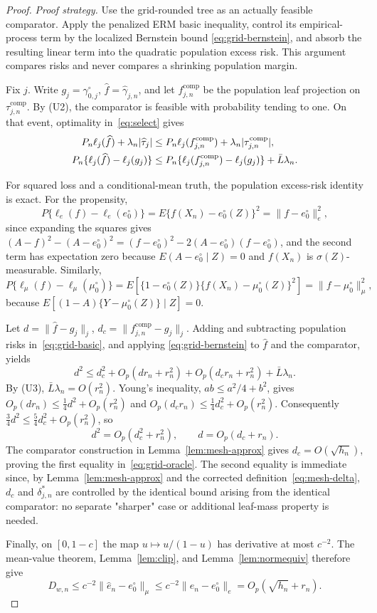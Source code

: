 \documentclass[11pt]{article}
\theoremstyle{plain}
\theoremstyle{definition}
\theoremstyle{remark}
\newcommand{\ez}{e_0}
\newcommand{\mz}{\mu_0}
\DeclarePairedDelimiter{\card}{\lvert}{\rvert}
\begin{document}
\begin{proof}
\emph{Proof strategy.} Use the grid-rounded tree as an actually feasible
comparator. Apply the penalized ERM basic inequality, control its
empirical-process term by the localized Bernstein bound
\eqref{eq:grid-bernstein}, and absorb the resulting linear term into the
quadratic population excess risk. This argument compares risks and never
compares a shrinking population margin.

Fix $j$. Write $g_j=\gamma_{0,j}^\circ$, $\widehat f=\widehat\gamma_{j,n}$,
and let $f^{\mathrm{comp}}_{j,n}$ be the population leaf projection on
$\tau^{\mathrm{comp}}_{j,n}$. By (U2), the comparator is feasible with
probability tending to one. On that event, optimality in~\eqref{eq:select}
gives
\begin{align}
 P_n\ell_j(\widehat f)+\lambda_n\card{\widehat\tau_j}
 &\le
 P_n\ell_j(f^{\mathrm{comp}}_{j,n})
   +\lambda_n\card{\tau^{\mathrm{comp}}_{j,n}},\\
 P_n\{\ell_j(\widehat f)-\ell_j(g_j)\}
 &\le
 P_n\{\ell_j(f^{\mathrm{comp}}_{j,n})-\ell_j(g_j)\}
   +\bar L\lambda_n.
 \label{eq:grid-basic}
\end{align}

For squared loss and a conditional-mean truth, the population excess-risk
identity is exact. For the propensity,
\[
 P\{\ell_e(f)-\ell_e(\ez^\circ)\}
 =E\{f(X_n)-\ez^\circ(Z)\}^2=\|f-\ez^\circ\|_e^2,
\]
since expanding the squares gives
$(A-f)^2-(A-\ez^\circ)^2=(f-\ez^\circ)^2-2(A-\ez^\circ)(f-\ez^\circ)$, and
the second term has expectation zero because $E(A-\ez^\circ\mid Z)=0$ and
$f(X_n)$ is $\sigma(Z)$-measurable. Similarly,
\[
 P\{\ell_\mu(f)-\ell_\mu(\mz^\circ)\}
 =E[\{1-\ez^\circ(Z)\}\{f(X_n)-\mz^\circ(Z)\}^2]
 =\|f-\mz^\circ\|_\mu^2,
\]
because $E[(1-A)\{Y-\mz^\circ(Z)\}\mid Z]=0$.

Let $d=\|\widehat f-g_j\|_j$, $d_c=\|f^{\mathrm{comp}}_{j,n}-g_j\|_j$.
Adding and subtracting population risks in~\eqref{eq:grid-basic}, and
applying \eqref{eq:grid-bernstein} to $\widehat f$ and the comparator,
yields
\[
 d^2
 \le d_c^2+O_p(dr_n+r_n^2)+O_p(d_cr_n+r_n^2)
       +\bar L\lambda_n.
\]
By (U3), $\bar L\lambda_n=O(r_n^2)$. Young's inequality,
$ab\le a^2/4+b^2$, gives $O_p(dr_n)\le\frac14d^2+O_p(r_n^2)$ and
$O_p(d_cr_n)\le\frac14d_c^2+O_p(r_n^2)$. Consequently
$\frac34d^2\le\frac54d_c^2+O_p(r_n^2)$, so
\[
 d^2=O_p(d_c^2+r_n^2),
 \qquad
 d=O_p(d_c+r_n).
\]
The comparator construction in Lemma~\ref{lem:mesh-approx} gives
$d_c=O(\sqrt{h_n})$, proving the first equality in~\eqref{eq:grid-oracle}.
The second equality is immediate since, by Lemma~\ref{lem:mesh-approx} and
the corrected definition~\eqref{eq:mesh-delta}, $d_c$ and $\delta^*_{j,n}$
are controlled by the identical bound arising from the identical
comparator: no separate "sharper" case or additional leaf-mass property is
needed.

Finally, on $[0,1-c]$ the map $u\mapsto u/(1-u)$ has derivative at most
$c^{-2}$. The mean-value theorem, Lemma~\ref{lem:clip}, and
Lemma~\ref{lem:normequiv} therefore give
\[
 D_{w,n}
 \le c^{-2}\|\widehat e_n-\ez^\circ\|_\mu
 \le c^{-2}\|\widehat e_n-\ez^\circ\|_e
 =O_p(\sqrt{h_n}+r_n).
\]
\end{proof}
\end{document}
